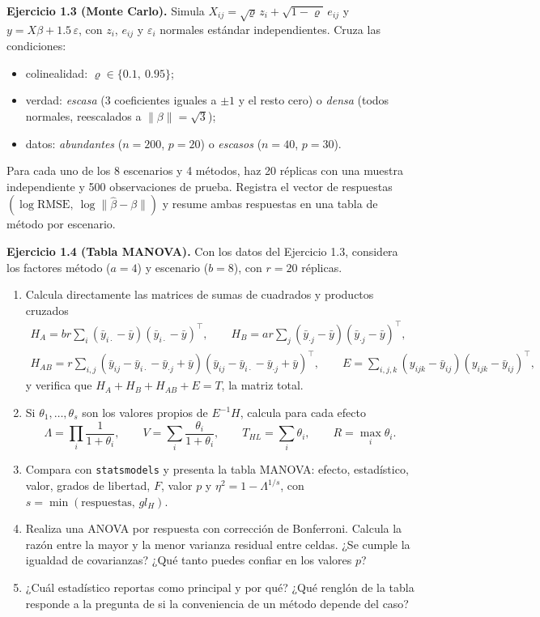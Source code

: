 \documentclass[11pt,letterpaper]{article}
\newcommand{\norm}[1]{\lVert #1\rVert}
\newcommand{\ejercicio}[1]{\par\medskip\textbf{Ejercicio #1.}\space}
\begin{document}
\ejercicio{1.3 (Monte Carlo)} Simula $X_{ij}=\sqrt{\varrho}\,z_i+\sqrt{1-\varrho}\,e_{ij}$ y $y=X\beta+1.5\,\varepsilon$, con $z_i$, $e_{ij}$ y $\varepsilon_i$ normales estándar independientes. Cruza las condiciones:
\begin{itemize}[itemsep=0.1em]
  \item colinealidad: $\varrho\in\{0.1,\ 0.95\}$;
  \item verdad: \emph{escasa} (3 coeficientes iguales a $\pm1$ y el resto cero) o \emph{densa} (todos normales, reescalados a $\norm{\beta}=\sqrt3$);
  \item datos: \emph{abundantes} ($n=200$, $p=20$) o \emph{escasos} ($n=40$, $p=30$).
\end{itemize}
Para cada uno de los 8 escenarios y 4 métodos, haz 20 réplicas con una muestra independiente y 500 observaciones de prueba. Registra el vector de respuestas $(\log\mathrm{RMSE},\ \log\norm{\hat\beta-\beta})$ y resume ambas respuestas en una tabla de método por escenario.

\ejercicio{1.4 (Tabla MANOVA)} Con los datos del Ejercicio 1.3, considera los factores método ($a=4$) y escenario ($b=8$), con $r=20$ réplicas.
\begin{enumerate}
  \item Calcula directamente las matrices de sumas de cuadrados y productos cruzados
  \begin{gather*}
  H_A=br\sum_i(\bar y_{i\cdot}-\bar y)(\bar y_{i\cdot}-\bar y)^\top,\qquad
  H_B=ar\sum_j(\bar y_{\cdot j}-\bar y)(\bar y_{\cdot j}-\bar y)^\top,\\
  H_{AB}=r\sum_{i,j}(\bar y_{ij}-\bar y_{i\cdot}-\bar y_{\cdot j}+\bar y)(\bar y_{ij}-\bar y_{i\cdot}-\bar y_{\cdot j}+\bar y)^\top,\qquad
  E=\sum_{i,j,k}(y_{ijk}-\bar y_{ij})(y_{ijk}-\bar y_{ij})^\top,
  \end{gather*}
  y verifica que $H_A+H_B+H_{AB}+E=T$, la matriz total.
  \item Si $\theta_1,\dots,\theta_s$ son los valores propios de $E^{-1}H$, calcula para cada efecto
  \[
  \Lambda=\prod_i\frac{1}{1+\theta_i},\qquad
  V=\sum_i\frac{\theta_i}{1+\theta_i},\qquad
  T_{HL}=\sum_i\theta_i,\qquad
  R=\max_i\theta_i .
  \]
  \item Compara con \texttt{statsmodels} y presenta la tabla MANOVA: efecto, estadístico, valor, grados de libertad, $F$, valor $p$ y $\eta^2=1-\Lambda^{1/s}$, con $s=\min(\text{respuestas},\,gl_H)$.
  \item Realiza una ANOVA por respuesta con corrección de Bonferroni. Calcula la razón entre la mayor y la menor varianza residual entre celdas. ¿Se cumple la igualdad de covarianzas? ¿Qué tanto puedes confiar en los valores $p$?
  \item ¿Cuál estadístico reportas como principal y por qué? ¿Qué renglón de la tabla responde a la pregunta de si la conveniencia de un método depende del caso?
\end{enumerate}
\end{document}
